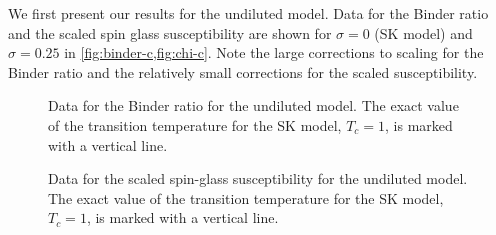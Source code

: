 We first present our results for the undiluted model. Data for the Binder ratio
and the scaled spin glass susceptibility are shown for $\sigma=0$ (SK model)
and $\sigma=0.25$ in \cref{fig:binder-c,fig:chi-c}. Note the large corrections
to scaling for the Binder ratio and the relatively small corrections for the
scaled susceptibility.

\begin{figure}
  \centering
  \begin{subfigure}{0.49\textwidth}
    \centering
    
  \end{subfigure}
  \begin{subfigure}{0.49\textwidth}
    \centering
    
  \end{subfigure}
  \caption[
    Data for the Binder ratio for the one-dimensional undiluted spin glass.
  ]
  {
    Data for the Binder ratio for the undiluted model. The exact value of the
    transition temperature for the SK model, $T_c=1$, is marked with a vertical
    line.
  }
  \label{fig:binder-c}
\end{figure}

\begin{figure}
  \centering
  \begin{subfigure}{0.49\textwidth}
    \centering
    
  \end{subfigure}
  \begin{subfigure}{0.49\textwidth}
    \centering
    
  \end{subfigure}
  \caption[
    Data for the Binder ratio and the scaled spin-glass susceptibility for the
    one-dimensional undiluted spin glass with $\sigma=0$ and $\sigma=0.25$.
  ]
  {
    Data for the scaled spin-glass susceptibility for the undiluted model. The
    exact value of the transition temperature for the SK model, $T_c=1$, is
    marked with a vertical line.
  }
  \label{fig:chi-c}
\end{figure}

